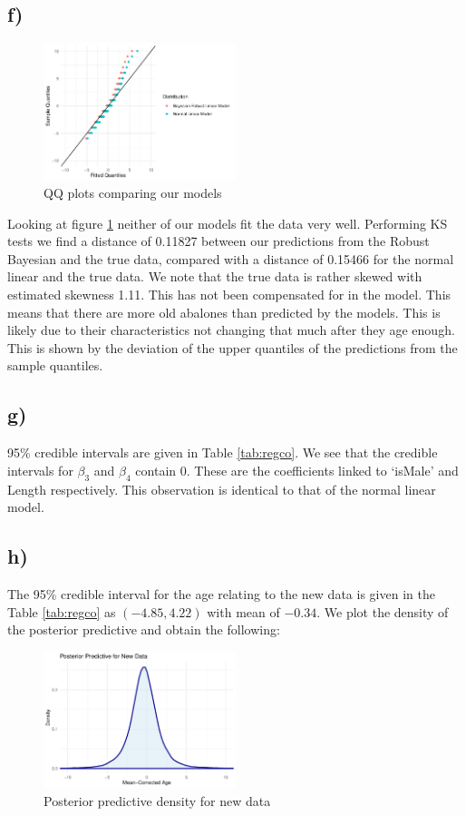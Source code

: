 \documentclass[10pt]{extarticle}
\begin{document}
\subsection*{f)}

\begin{figure}[H]
	\centering
	\includegraphics[width = 0.5\textwidth]{../qqplotmodcomp}
	\caption{QQ plots comparing our models}
	\label{fig:qqp}
\end{figure}
Looking at figure \ref{fig:qqp} neither of our models fit the data very well. Performing KS tests we find a distance of 0.11827 between our predictions from the Robust Bayesian and the true data, compared with a distance of 0.15466 for the normal linear and the true data. We note that the true data is rather skewed with estimated skewness 1.11. This has not been compensated for in the model. This means that there are more old abalones than predicted by the models. This is likely due to their characteristics not changing that much after they age enough. This is shown by the deviation of the upper quantiles of the predictions from the sample quantiles.

\subsection*{g)}

95\% credible intervals are given in Table \ref{tab:regco}. We see that the credible intervals for $\beta_3$ and  $\beta_4$ contain 0. These are the coefficients linked to `isMale' and Length respectively. This observation is identical to that of the normal linear model. 

\subsection*{h)}

The 95\% credible interval for the age relating to the  new data is given in the Table \ref{tab:regco} as $(-4.85, 4.22)$ with mean of $-0.34$. We plot the density of the posterior predictive and obtain the following:

\begin{figure}[H]
	\centering
	\includegraphics[width = 0.5\textwidth]{../pprednd}
	\caption{Posterior predictive density for new data}
	\label{fig:ppnd}
\end{figure}
\end{document}
